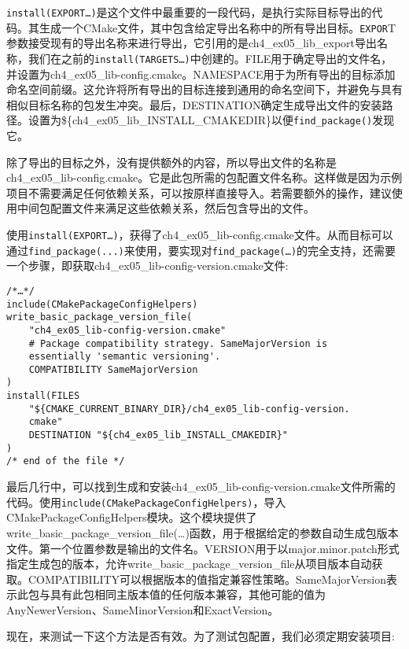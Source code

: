 \texttt{install(EXPORT…)}是这个文件中最重要的一段代码，是执行实际目标导出的代码。其生成一个CMake文件，其中包含给定导出名称中的所有导出目标。\texttt{EXPOR}T参数接受现有的导出名称来进行导出，它引用的是ch4\_ex05\_lib\_export导出名称，我们在之前的\texttt{install(TARGETS…)}中创建的。FILE用于确定导出的文件名，并设置为ch4\_ex05\_lib-config.cmake。NAMESPACE用于为所有导出的目标添加命名空间前缀。这允许将所有导出的目标连接到通用的命名空间下，并避免与具有相似目标名称的包发生冲突。最后，DESTINATION确定生成导出文件的安装路径。设置为\$\{ch4\_ex05\_lib\_INSTALL\_CMAKEDIR\}以便\texttt{find\_package()}发现它。

\begin{tcolorbox}[colback=webgreen!5!white,colframe=webgreen!75!black,title=Note]
除了导出的目标之外，没有提供额外的内容，所以导出文件的名称是ch4\_ex05\_lib-config.cmake。它是此包所需的包配置文件名称。这样做是因为示例项目不需要满足任何依赖关系，可以按原样直接导入。若需要额外的操作，建议使用中间包配置文件来满足这些依赖关系，然后包含导出的文件。
\end{tcolorbox}

使用\texttt{install(EXPORT…)}，获得了ch4\_ex05\_lib-config.cmake文件。从而目标可以通过\texttt{find\_package(...)}来使用，要实现对\texttt{find\_package(…)}的完全支持，还需要一个步骤，即获取ch4\_ex05\_lib-config-version.cmake文件:

\begin{lstlisting}[style=styleCMake]
/*…*/
include(CMakePackageConfigHelpers)
write_basic_package_version_file(
	"ch4_ex05_lib-config-version.cmake"
	# Package compatibility strategy. SameMajorVersion is
	essentially 'semantic versioning'.
	COMPATIBILITY SameMajorVersion
)
install(FILES
	"${CMAKE_CURRENT_BINARY_DIR}/ch4_ex05_lib-config-version.
	cmake"
	DESTINATION "${ch4_ex05_lib_INSTALL_CMAKEDIR}"
)
/* end of the file */
\end{lstlisting}

最后几行中，可以找到生成和安装ch4\_ex05\_lib-config-version.cmake文件所需的代码。使用\texttt{include(CMakePackageConfigHelpers)}，导入CMakePackageConfigHelpers模块。这个模块提供了write\_basic\_package\_version\_file(…)函数，用于根据给定的参数自动生成包版本文件。第一个位置参数是输出的文件名。VERSION用于以major.minor.patch形式指定生成包的版本，允许write\_basic\_package\_version\_file从项目版本自动获取。COMPATIBILITY可以根据版本的值指定兼容性策略。SameMajorVersion表示此包与具有此包相同主版本值的任何版本兼容，其他可能的值为AnyNewerVersion、SameMinorVersion和ExactVersion。

现在，来测试一下这个方法是否有效。为了测试包配置，我们必须定期安装项目:


